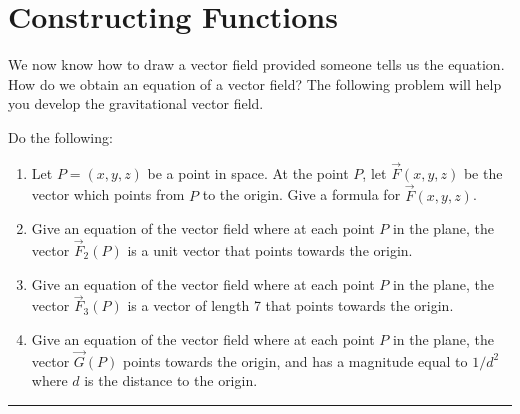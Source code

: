 \section{Constructing Functions}
We now know how to draw a vector field provided someone tells us the equation. How do we obtain an equation of a vector field? The following problem will help you develop the gravitational vector field.

\begin{problem}
%
Do the following:
\begin{enumerate}
 \item Let $P=(x,y,z)$ be a point in space.  At the point $P$, let $\vec F(x,y,z)$ be the vector which points from $P$ to the origin.  Give a formula for $\vec F(x,y,z)$.
 \item Give an equation of the vector field where at each point $P$ in the plane, the vector $\vec F_2(P)$ is a unit vector that points towards the origin.
 \item Give an equation of the vector field where at each point $P$ in the plane, the vector $\vec F_3(P)$ is a vector of length 7 that points towards the origin.
 \item Give an equation of the vector field where at each point $P$ in the plane, the vector $\vec G(P)$ points towards the origin, and has a magnitude equal to $1/d^2$ where $d$ is the distance to the origin.
\end{enumerate}
\hrule\end{problem}

